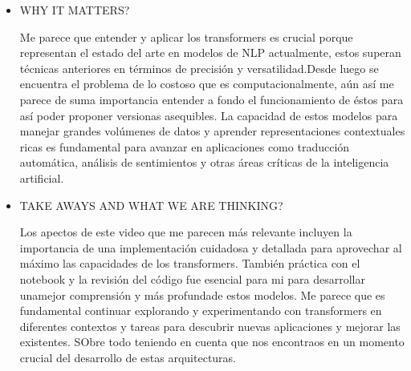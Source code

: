 \documentclass[letter, 11pt, twoside]{report}
\begin{document}
\begin{itemize}
    \item WHY IT MATTERS?
    
    Me parece que entender y aplicar los transformers es crucial porque representan el estado del arte en modelos de NLP actualmente, estos superan técnicas anteriores en términos de precisión y versatilidad.Desde luego se encuentra el problema de lo costoso que es computacionalmente, aún así me parece de suma importancia entender a fondo el funcionamiento de éstos para así poder proponer versionas asequibles. La capacidad de estos modelos para manejar grandes volúmenes de datos y aprender representaciones contextuales ricas es fundamental para avanzar en aplicaciones como traducción automática, análisis de sentimientos y otras áreas críticas de la inteligencia artificial.
    \item TAKE AWAYS AND WHAT WE ARE THINKING?
    
    Los apectos de este video que me parecen más relevante incluyen la importancia de una implementación cuidadosa y detallada para aprovechar al máximo las capacidades de los transformers. También práctica con el notebook y la revisión del código fue esencial para mi para desarrollar unamejor comprensión y más profundade estos modelos. Me parece que es fundamental continuar explorando y experimentando con transformers en diferentes contextos y tareas para descubrir nuevas aplicaciones y mejorar las existentes. SObre todo teniendo en cuenta que nos encontraos en un momento crucial del desarrollo de estas arquitecturas.
\end{itemize}
\end{document}
